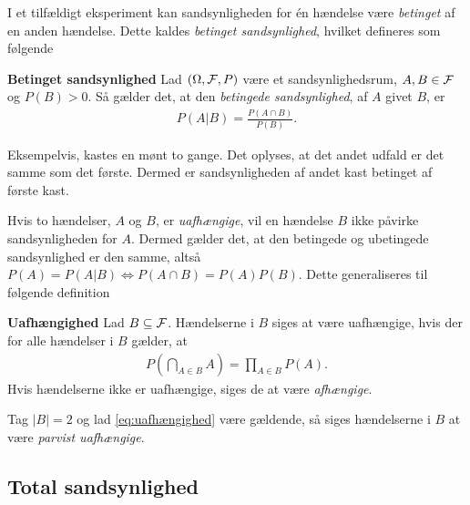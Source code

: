 I et tilfældigt eksperiment kan sandsynligheden for én hændelse være \textit{betinget} af en anden hændelse. Dette kaldes \textit{betinget sandsynlighed}, hvilket defineres som følgende

\begin{minipage}\textwidth
\begin{defn}\textbf{Betinget sandsynlighed} \label{def:betinget_sandsynlighed}%
\newline
Lad $(\Omega, \mathcal{F}, P)$ være et sandsynlighedsrum, $A,B\in \mathcal{F}$ og $P(B)>0$. Så gælder det, at den \textit{betingede sandsynlighed}, af $A$ givet $B$, er
\begin{align*}
      \displaystyle P(A|B)=\frac{P(A\cap B)}{P(B)}.
\end{align*}
\end{defn}
\end{minipage}

Eksempelvis, kastes en mønt to gange. Det oplyses, at det andet udfald er det samme som det første. Dermed er sandsynligheden af andet kast betinget af første kast.

Hvis to hændelser, $A$ og $B$, er \textit{uafhængige}, vil en hændelse $B$ ikke påvirke sandsynligheden for $A$. Dermed gælder det, at den betingede og ubetingede sandsynlighed er den samme, altså $P(A)=P(A|B)\Leftrightarrow P(A\cap B)=P(A)P(B)$. Dette generaliseres til følgende definition

\begin{minipage}\textwidth
\begin{defn}\textbf{Uafhængighed} %
\newline
Lad $B\subseteq \mathcal{F}$. Hændelserne i $B$ siges at være uafhængige, hvis der for alle hændelser i $B$ gælder, at
\begin{align}\label{eq:uafhængighed}
    P\left(\bigcap_{A\in B} A\right)=\prod_{A\in B} P(A).
\end{align}
Hvis hændelserne ikke er uafhængige, siges de at være \textit{afhængige}.
\end{defn}
\end{minipage}

Tag $|B|=2$ og lad \eqref{eq:uafhængighed} være gældende, så siges hændelserne i $B$ at være \textit{parvist uafhængige}.

\subsection{Total sandsynlighed}

